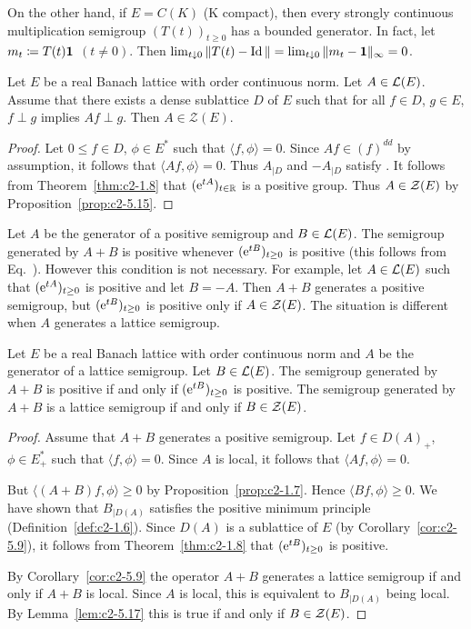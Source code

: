 On the other hand, if\/ $E = C(K)$ (K compact), then every strongly continuous multiplication semigroup $(T(t))_{t \geq 0}$ has a bounded generator.
In fact, let $m_t \coloneq T(t)\mathbf{1}$ $(t \neq 0)$.
Then $\lim_{t \downarrow 0}\|T(t) - \operatorname{Id}\| =    \lim_{t \downarrow 0}\|m_t - \mathbf{1}\|_{\infty} = 0$.
\begin{lemma}\label{lem:c2-5.17}
%
Let $E$ be a real Banach lattice with order continuous norm.
Let $A \in \mathcal{L}(E)$.
Assume that there exists a dense sublattice $D$ of\/ $E$ such that for all $f \in D$, $g \in E$, $f \perp g$ implies $Af \perp g$.
Then $A \in \mathcal{Z}(E)$.
\end{lemma}
\begin{proof}
Let $0 \leq f \in D$, $\phi \in E^*$ such that $\langle f,\phi \rangle = 0$.
Since $Af \in (f)^{dd}$ by assumption, it follows that $\langle Af,\phi \rangle = 0$.
Thus $A_{\vert D }$ and $-A_{\vert D}$ satisfy .
It follows from Theorem~\ref{thm:c2-1.8}    that $(\mathrm{e}^{tA})_{t \in \mathbb{R}}$ is a positive group.
Thus $A \in \mathcal{Z}(E)$ by  Proposition~\ref{prop:c2-5.15}.
\end{proof}
Let $A$ be the generator of a positive semigroup and $B \in \mathcal{L}(E)$. 
The semigroup generated by $A + B$ is positive whenever $(\eu^{tB})_{t \geq 0}$ is positive (this follows from Eq.~).
However this condition is not necessary. 
For example, let $A \in \mathcal{L}(E)$ such that $(\eu^{tA})_{t \geq 0}$ is positive and let $B = -A$.
Then $A + B$ generates a positive semigroup, but $(\eu^{tB})_{t \geq 0}$ is positive only if\/ $A \in \mathcal{Z}(E)$.
The situation is different when $A$ generates a lattice semigroup.
\begin{theorem}\label{thm:c2-5.18}
Let $E$ be a real Banach lattice with order continuous norm and $A$ be the generator of a lattice semigroup.
Let $B \in \mathcal{L}(E)$.
The semigroup generated by $A + B$ is positive if and only if\/ $(\eu^{tB})_{t \geq 0}$ is positive.
The semigroup generated by $A + B$ is a lattice semigroup if and only if\/ $B \in \mathcal{Z}(E)$.
\end{theorem}
\begin{proof}
Assume that $A + B$ generates a positive semigroup.
Let $f \in D(A)_{+}$, $\phi \in E_{+}^*$ such that $\langle f,\phi \rangle = 0$.
Since $A$ is local, it follows that $\langle Af,\phi \rangle = 0$.

But $\langle (A+B)f,\phi \rangle \geq 0$ by  Proposition~\ref{prop:c2-1.7}.
Hence $\langle Bf,\phi \rangle \geq 0$.
We have shown that $B_{\vert D(A)}$ satisfies the positive minimum principle (Definition~\ref{def:c2-1.6}).
Since $D(A)$ is a sublattice of\/ $E$ (by Corollary~\ref{cor:c2-5.9}), it follows from Theorem~\ref{thm:c2-1.8}   that $(\eu^{tB})_{t \geq 0}$ is positive.

By Corollary~\ref{cor:c2-5.9} the operator $A + B$ generates a lattice semigroup if and only if\/ $A + B$ is local.
Since $A$ is local, this is equivalent to $B_{\vert D(A)}$ being local.
By Lemma~\ref{lem:c2-5.17} this is true if and only if\/ $B \in \mathcal{Z}(E)$.
\end{proof}
